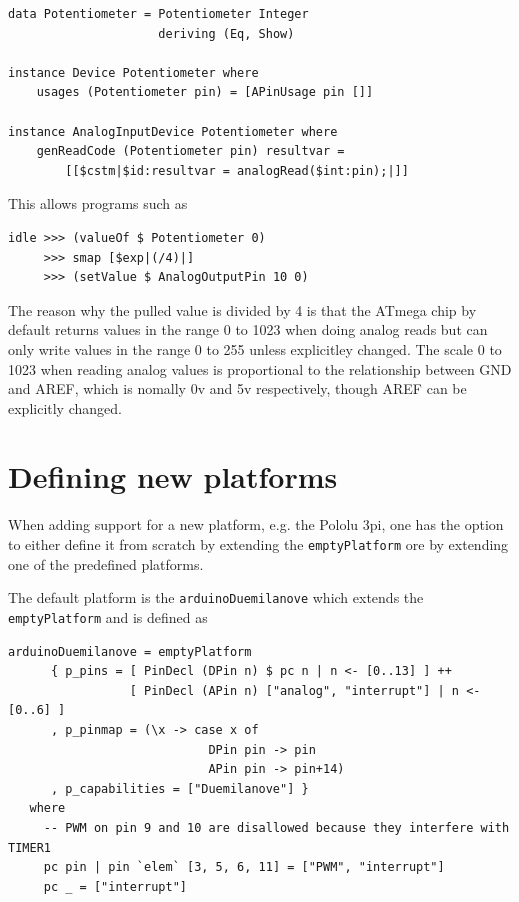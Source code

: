 \documentclass[a4paper, oneside, final]{memoir}
\begin{document}
\begin{verbatim}
data Potentiometer = Potentiometer Integer
                     deriving (Eq, Show)

instance Device Potentiometer where
    usages (Potentiometer pin) = [APinUsage pin []]

instance AnalogInputDevice Potentiometer where
    genReadCode (Potentiometer pin) resultvar = 
        [[$cstm|$id:resultvar = analogRead($int:pin);|]]
\end{verbatim}

This allows programs such as

\begin{verbatim}
idle >>> (valueOf $ Potentiometer 0) 
     >>> smap [$exp|(/4)|] 
     >>> (setValue $ AnalogOutputPin 10 0)
\end{verbatim}

The reason why the pulled value is divided by 4 is that the ATmega
chip by default returns values in the range 0 to 1023 when doing
analog reads but can only write values in the range 0 to 255 unless
explicitley changed. The scale 0 to 1023 when reading analog values is
proportional to the relationship between GND and AREF, which is
nomally 0v and 5v respectively, though AREF can be explicitly changed.

\section{Defining new platforms}

When adding support for a new platform, e.g. the Pololu 3pi, one has the option
to either define it from scratch by extending the \texttt{emptyPlatform} ore by
extending one of the predefined platforms. 

The default platform is the \texttt{arduinoDuemilanove} which extends the
\texttt{emptyPlatform} and is defined as

\begin{verbatim}
arduinoDuemilanove = emptyPlatform 
      { p_pins = [ PinDecl (DPin n) $ pc n | n <- [0..13] ] ++
                 [ PinDecl (APin n) ["analog", "interrupt"] | n <- [0..6] ]
      , p_pinmap = (\x -> case x of
                            DPin pin -> pin
                            APin pin -> pin+14)
      , p_capabilities = ["Duemilanove"] }
   where
     -- PWM on pin 9 and 10 are disallowed because they interfere with TIMER1
     pc pin | pin `elem` [3, 5, 6, 11] = ["PWM", "interrupt"] 
     pc _ = ["interrupt"]
\end{verbatim}
\end{document}
